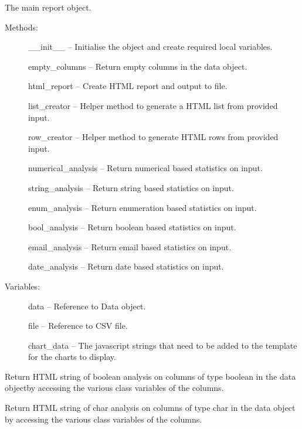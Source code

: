 \documentclass[letterpaper,10pt,english]{sphinxmanual}
\begin{document}
\begin{fulllineitems}
\label{Code_rst/rep:report.Report}
The main report object.
\begin{description}
\item[{Methods:}] \leavevmode
\_\_init\_\_ -- Initialise the object and create required local variables.

empty\_columns -- Return empty columns in the data object.

html\_report -- Create HTML report and output to file.

list\_creator -- Helper method to generate a HTML list from provided input.

row\_creator -- Helper method to generate HTML rows from provided input.

numerical\_analysis -- Return numerical based statistics on input.

string\_analysis -- Return string based statistics on input.

enum\_analysis -- Return enumeration based statistics on input.

bool\_analysis -- Return boolean based statistics on input.

email\_analysis -- Return email based statistics on input.

date\_analysis -- Return date based statistics on input.

\item[{Variables:}] \leavevmode
data -- Reference to Data object.

file -- Reference to CSV file.

chart\_data -- The javascript strings that need to be added to the template for the charts to display.

\end{description}

\begin{fulllineitems}
\label{Code_rst/rep:report.Report.boolean_analysis}
Return HTML string of boolean analysis on columns of type boolean
in the data objectby accessing the various class variables of the
columns.

\end{fulllineitems}


\begin{fulllineitems}
\label{Code_rst/rep:report.Report.char_analysis}
Return HTML string of char analysis on columns of type char 
in the data object by accessing the various class variables of the
columns.


\end{fulllineitems}
\end{fulllineitems}
\end{document}
